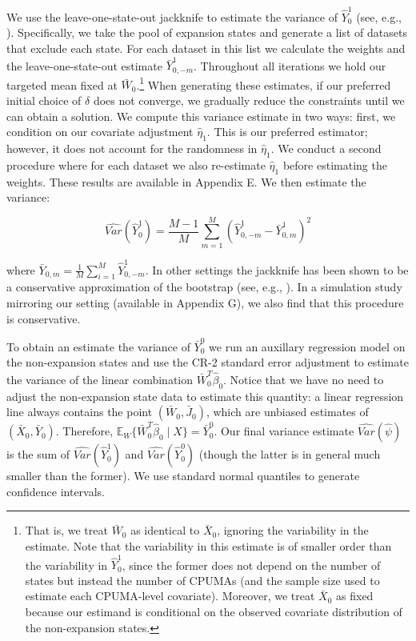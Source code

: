 \documentclass[aoas]{imsart}
\theoremstyle{plain}
\theoremstyle{remark}
\begin{document}
We use the leave-one-state-out jackknife to estimate the variance of $\hat{Y}_0^1$ (see, e.g., \cite{cameron2015practitioner}). Specifically, we take the pool of expansion states and generate a list of datasets that exclude each state. For each dataset in this list we calculate the weights and the leave-one-state-out estimate $\bar{Y}^1_{0, -m}$. Throughout all iterations we hold our targeted mean fixed at $\bar{W}_0$.\footnote{That is, we treat $\bar{W}_0$ as identical to $\bar{X}_0$, ignoring the variability in the estimate. Note that the variability in this estimate is of smaller order than the variability in $\hat{Y}_0^1$, since the former does not depend on the number of states but instead the number of CPUMAs (and the sample size used to estimate each CPUMA-level covariate). Moreover, we treat $\bar{X}_0$ as fixed because our estimand is conditional on the observed covariate distribution of the non-expansion states.} When generating these estimates, if our preferred initial choice of $\delta$ does not converge, we gradually reduce the constraints until we can obtain a solution. We compute this variance estimate in two ways: first, we condition on our covariate adjustment $\hat{\eta}_1$. This is our preferred estimator; however, it does not account for the randomness in $\hat{\eta}_1$. We conduct a second procedure where for each dataset we also re-estimate $\hat{\eta}_1$ before estimating the weights. These results are available in Appendix E. We then estimate the variance:

\begin{equation}
    \hat{Var}(\hat{Y}_0^1) = \frac{M - 1}{M}\sum_{m = 1}^M(\hat{Y}^1_{0,-m} - \bar{Y}^1_{0, m})^2
\end{equation}

where $\bar{Y}_{0, m} = \frac{1}{M}\sum_{i=1}^M\hat{Y}^1_{0, -m}$. In other settings the jackknife has been shown to be a conservative approximation of the bootstrap (see, e.g., \cite{efron1981jackknife}). In a simulation study mirroring our setting (available in Appendix G), we also find that this procedure is conservative.

To obtain an estimate the variance of $\bar{Y}_0^0$ we run an auxillary regression model on the non-expansion states and use the CR-2 standard error adjustment to estimate the variance of the linear combination $\bar{W}_0^T\hat{\beta}_0$. Notice that we have no need to adjust the non-expansion state data to estimate this quantity: a linear regression line always contains the point $(\bar{W}_0, \bar{J}_0)$, which are unbiased estimates of $(\bar{X}_0, \bar{Y}_0)$. Therefore, $\mathbb{E}_W\{\bar{W}_0^T\hat{\beta}_0 \mid X\} = \bar{Y}_0^0$. Our final variance estimate $\hat{Var}(\hat{\psi})$ is the sum of $\hat{Var}(\hat{Y}_0^1)$ and $\hat{Var}(\hat{Y}_0^0)$ (though the latter is in general much smaller than the former). We use standard normal quantiles to generate confidence intervals. 
\end{document}
